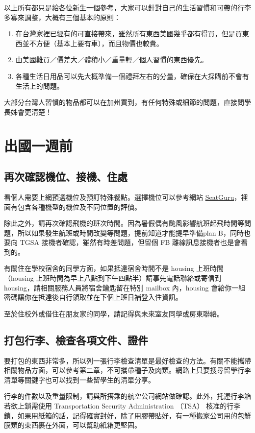 \documentclass[10pt,a4paper]{book}
\begin{document}
\begin{CJK}{UTF8}{bkai}
以上所有都只是給各位新生一個參考，大家可以針對自己的生活習慣和可帶的行李多寡來調整，大概有三個基本的原則：
\begin{enumerate}
\item 在台灣家裡已經有的可直接帶來，雖然所有東西美國幾乎都有得買，但是買東西並不方便（基本上要有車），而且物價也較貴。
\item 由美國難買／價差大／體積小／重量輕／個人習慣的東西優先。
\item 各種生活日用品可以先大概準備一個禮拜左右的分量，確保在大採購前不會有生活上的問題。 
\end{enumerate}
大部分台灣人習慣的物品都可以在加州買到，有任何特殊或細節的問題，直接問學長姊會更清楚！

\chapter{出國一週前}
\section{再次確認機位、接機、住處}

看個人需要上網預選機位及預訂特殊餐點。選擇機位可以參考網站 \href{http://www.seatguru.com/}{SeatGuru}，裡面有包含各種機型的機位及不同位置的評價。

除此之外，請再次確認飛機的班次時間。因為暑假偶有颱風影響航班起飛時間等問題，所以如果發生航班或時間改變等問題，提前知道才能提早準備plan B，同時也要向 TGSA 接機者確認，雖然有時差問題，但留個 FB 離線訊息接機者也是會看到的。

有關住在學校宿舍的同學方面，如果抵達宿舍時間不是 housing 上班時間（housing 上班時間為早上八點到下午四點半）請事先電話聯絡或寄信到 housing，請相關服務人員將宿舍鑰匙留在特別 mailbox 內，housing 會給你一組密碼讓你在抵達後自行領取並在下個上班日補登入住資訊。

至於住校外或借住在朋友家的同學，請記得與未來室友同學或房東聯絡。

\section{打包行李、檢查各項文件、證件}

要打包的東西非常多，所以列一張行李檢查清單是最好檢查的方法。有關不能攜帶相關物品方面，可以參考第二章，不可攜帶種子及肉類。網路上只要搜尋留學行李清單等關鍵字也可以找到一些留學生的清單分享。

行李的件數以及重量限制，請與所搭乘的航空公司網站做確認。此外，托運行李箱若欲上鎖需使用 Transportation Security Administration （TSA） 核准的行李鎖，如果用紙箱的話，記得確實封好，除了用膠帶貼好，有一種搬家公司用的包鮮膜類的東西裹在外面，可以幫助紙箱更堅固。


\end{CJK}
\end{document}
